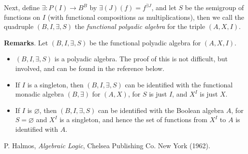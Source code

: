 \documentclass[12pt]{article}
\begin{document}
Next, define $\exists: P(I)\to B^B$ by $\exists(J)(f)=f^{\exists J}$, and let $S$ be the semigroup of functions on $I$ (with functional compositions as multiplications), then we call the quadruple $(B,I,\exists,S)$ the \emph{functional polyadic algebra} for the triple $(A,X,I)$.

\textbf{Remarks}.  Let $(B,I,\exists,S)$ be the functional polyadic algebra for $(A,X,I)$.
\begin{itemize}
\item $(B,I,\exists,S)$ is a polyadic algebra.  The proof of this is not difficult, but involved, and can be found in the reference below.
\item If $I$ is a singleton, then $(B,I,\exists,S)$ can be identified with the functional monadic algebra $(B,\exists)$ for $(A,X)$, for $S$ is just $I$, and $X^I$ is just $X$.
\item If $I$ is $\varnothing$, then $(B,I,\exists,S)$ can be identified with the Boolean algebra $A$, for $S=\varnothing$ and $X^I$ is a singleton, and hence the set of functions from $X^I$ to $A$ is identified with $A$.
\end{itemize}

\begin{thebibliography}{8}
 P. Halmos, \emph{Algebraic Logic}, Chelsea Publishing Co. New York (1962).
\end{thebibliography}

\end{document}
